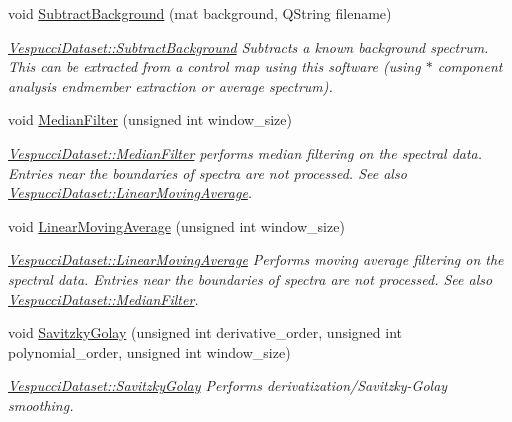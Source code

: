 \begin{DoxyCompactItemize}
\item 
void \hyperlink{class_vespucci_dataset_a9e8babb51db520d6610d532ad88c4cce}{Subtract\+Background} (mat background, Q\+String filename)
\begin{DoxyCompactList}\small\item\em \hyperlink{class_vespucci_dataset_a9e8babb51db520d6610d532ad88c4cce}{Vespucci\+Dataset\+::\+Subtract\+Background} Subtracts a known background spectrum. This can be extracted from a control map using this software (using $\ast$ component analysis endmember extraction or average spectrum). \end{DoxyCompactList}\item 
void \hyperlink{class_vespucci_dataset_aafa57b522cc3ddf08d518f862ad236b5}{Median\+Filter} (unsigned int window\+\_\+size)
\begin{DoxyCompactList}\small\item\em \hyperlink{class_vespucci_dataset_aafa57b522cc3ddf08d518f862ad236b5}{Vespucci\+Dataset\+::\+Median\+Filter} performs median filtering on the spectral data. Entries near the boundaries of spectra are not processed. See also \hyperlink{class_vespucci_dataset_ad072276ddcc37b972639d590d05a4430}{Vespucci\+Dataset\+::\+Linear\+Moving\+Average}. \end{DoxyCompactList}\item 
void \hyperlink{class_vespucci_dataset_ad072276ddcc37b972639d590d05a4430}{Linear\+Moving\+Average} (unsigned int window\+\_\+size)
\begin{DoxyCompactList}\small\item\em \hyperlink{class_vespucci_dataset_ad072276ddcc37b972639d590d05a4430}{Vespucci\+Dataset\+::\+Linear\+Moving\+Average} Performs moving average filtering on the spectral data. Entries near the boundaries of spectra are not processed. See also \hyperlink{class_vespucci_dataset_aafa57b522cc3ddf08d518f862ad236b5}{Vespucci\+Dataset\+::\+Median\+Filter}. \end{DoxyCompactList}\item 
void \hyperlink{class_vespucci_dataset_a8121d9aa54b36860dbc66db4d7fde8cd}{Savitzky\+Golay} (unsigned int derivative\+\_\+order, unsigned int polynomial\+\_\+order, unsigned int window\+\_\+size)
\begin{DoxyCompactList}\small\item\em \hyperlink{class_vespucci_dataset_a8121d9aa54b36860dbc66db4d7fde8cd}{Vespucci\+Dataset\+::\+Savitzky\+Golay} Performs derivatization/\+Savitzky-\/\+Golay smoothing. \end{DoxyCompactList}\item 

\end{DoxyCompactItemize}
